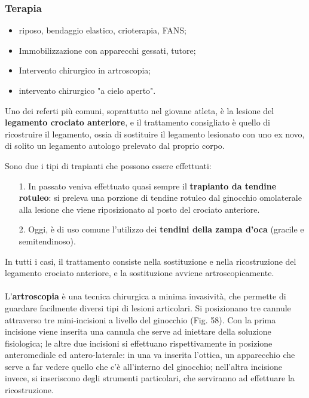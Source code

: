 \subsubsection{Terapia}
\begin{itemize}
\item riposo, bendaggio elastico, crioterapia, FANS;
\item Immobilizzazione con apparecchi gessati, tutore;
\item Intervento chirurgico in artroscopia;
\item intervento chirurgico "a cielo aperto".
\end{itemize}
Uno dei referti più comuni, soprattutto nel giovane atleta, è la lesione del \textbf{legamento crociato anteriore}, e il trattamento consigliato è quello di ricostruire il legamento, ossia di sostituire il legamento lesionato con uno ex novo, di solito un legamento autologo prelevato dal proprio corpo.

Sono due i tipi di trapianti che possono essere effettuati:
\begin{itemize}
\item[1.] In passato veniva effettuato quasi sempre il \textbf{trapianto da tendine rotuleo}: si preleva una porzione di tendine rotuleo dal ginocchio omolaterale alla lesione che viene riposizionato al posto del crociato anteriore.
\item[2.] Oggi, è di uso comune l'utilizzo dei \textbf{tendini della zampa d'oca} (gracile e semitendinoso).
\end{itemize}

In tutti i casi, il trattamento consiste nella sostituzione e nella ricostruzione del legamento crociato anteriore, e la sostituzione avviene artroscopicamente.
\\\\
L'\textbf{artroscopia} è una tecnica chirurgica a minima invasività, che permette di guardare facilmente diversi tipi di lesioni articolari. Si posizionano tre cannule attraverso tre mini-incisioni a livello del ginocchio (Fig. 58). Con la prima incisione viene inserita una cannula che serve ad iniettare della soluzione fisiologica; le altre due incisioni si effettuano rispettivamente in posizione anteromediale ed antero-laterale: in una va inserita l'ottica, un apparecchio che serve a far vedere quello che c'è all'interno del ginocchio; nell'altra incisione invece, si inseriscono degli strumenti particolari, che serviranno ad effettuare la ricostruzione.

